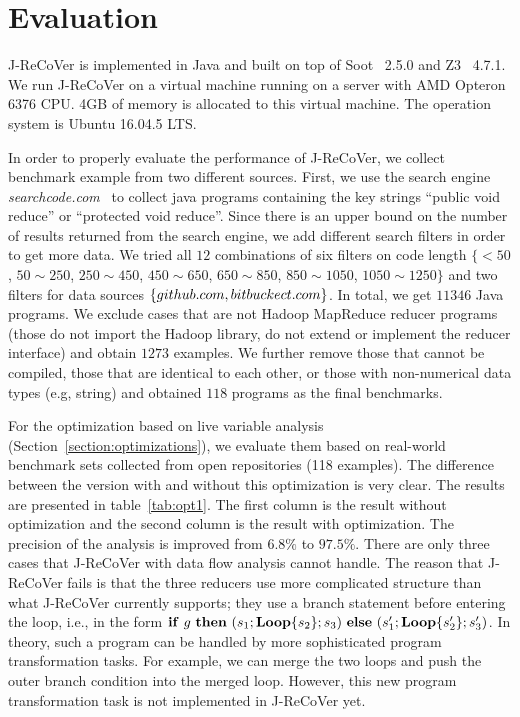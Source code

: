\documentclass{llncs}
\newcommand{\hide}[1]{}
\newcommand{\ite}[3]{
	 \ifmmode
	 \mathbf{if}\ #1 \ \mathbf{then}\ #2\  \mathbf{else}\ #3
	 \else
	 \textbf{if}\ #1 \ \textbf{then}\ #2\  \textbf{else}\ #3
	 \fi}
\newcommand{\rloop}{
	\ifmmode
	\mathbf{Loop}
	\else
	\textbf{Loop}
	\fi}
\begin{document}
\section{Evaluation}
\label{section:exp}
J-ReCoVer is implemented in Java and built on top of Soot~\cite{soot} 2.5.0 and Z3~\cite{z3} 4.7.1. We run J-ReCoVer on a virtual machine running on a server with AMD Opteron 6376 CPU. 4GB of memory is allocated to this virtual machine. The operation system is Ubuntu 16.04.5 LTS.


In order to properly evaluate the performance of J-ReCoVer, we collect benchmark example from two different sources.
First, we use the search engine \emph{searchcode.com}~\cite{searchcode} to collect java programs containing the key strings ``public void reduce'' or ``protected void reduce''. Since there is an upper bound on the number of results returned from the search engine, we add different search filters in order to get more data. We tried all $12$ combinations of six filters on code length $\{<50$, $ 50\sim 250$, $250\sim 450$, $450\sim 650$, $650\sim 850$, $850\sim 1050$, $1050\sim 1250\}$
and two filters for data sources $\{github.com, bitbuckect.com\}$. In total, we get $11346$ Java programs. We exclude cases that are not Hadoop MapReduce reducer programs (those do not import the Hadoop library, do not extend or implement the reducer interface) and obtain $1273$ examples. We further remove those that cannot be compiled, those that are identical to each other, or those with non-numerical data types (e.g, string) and obtained $118$ programs as the final benchmarks.

\hide{The second set of examples are those have been discussed in verification literature~\cite{ChenHSW15,ChenSW16}. This set is relatively small, we have only $10$ examples.
We also created a program that randomly generates reducer programs in order to test the scalability of J-ReCoVer.
All benchmark examples can be found on the website of J-ReCoVer.}

For the optimization based on live variable analysis (Section~\ref{section:optimizations}), we evaluate them based on real-world benchmark sets collected from open repositories (118 examples). The difference between the version with and without this optimization is very clear. The results are presented in table~\ref{tab:opt1}. The first column is the result without optimization and the second column is the result with optimization. The precision of the analysis is improved from $6.8\%$ to $97.5\%$. There are only three cases that J-ReCoVer with data flow analysis cannot handle. The reason that J-ReCoVer fails is that the three reducers use more complicated structure than what J-ReCoVer currently supports; they use a branch statement before entering the loop, i.e., in the form $\ite{g}{(s_1;\rloop\{s_2\};s_3)}{(s'_1;\rloop\{s'_2\};s'_3)}$. In theory, such a program can be handled by more sophisticated program transformation tasks. For example, we can merge the two loops and push the outer branch condition into the merged loop.
However, this new program transformation task is not implemented in J-ReCoVer yet.
\end{document}

